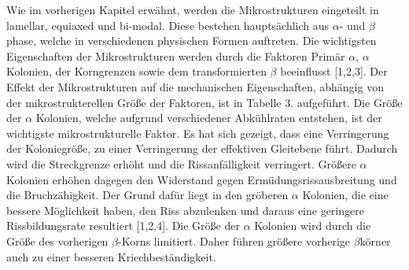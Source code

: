 Wie im vorherigen Kapitel erwähnt, werden die Mikrostrukturen eingeteilt in lamellar, equiaxed und bi-modal. Diese bestehen hauptsächlich aus $\alpha$- und $\beta$phase, welche in verschiedenen physischen Formen auftreten. Die wichtigsten Eigenschaften der Mikrostrukturen werden durch die Faktoren Primär $\alpha$, $\alpha$ Kolonien, der Korngrenzen sowie dem transformierten $\beta$ beeinflusst [1,2,3]. Der Effekt der Mikrostrukturen auf die mechanischen Eigenschaften, abhängig von der mikrostrukterellen Größe der Faktoren, ist in Tabelle 3. aufgeführt. Die Größe der $\alpha$ Kolonien, welche aufgrund verschiedener Abkühlraten entstehen, ist der wichtigste mikrostrukturelle Faktor. Es hat sich gezeigt, dass eine Verringerung der Koloniegröße, zu einer Verringerung der effektiven Gleitebene führt. Dadurch wird die Streckgrenze erhöht und die Rissanfälligkeit verringert. Größere $\alpha$ Kolonien erhöhen dagegen den Widerstand gegen Ermüdungsrissausbreitung und die Bruchzähigkeit. Der Grund dafür liegt in den gröberen $\alpha$ Kolonien, die eine bessere Möglichkeit haben, den Riss abzulenken und daraus eine geringere Rissbildungsrate resultiert [1,2,4]. Die Größe der $\alpha$ Kolonien wird durch die Größe des vorherigen $\beta$-Korns limitiert. Daher führen größere vorherige $\beta$körner auch zu einer besseren Kriechbeständigkeit.


